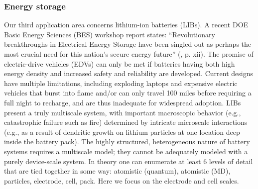 \documentclass[11pt]{article}
\newcommand{\MarginPar}[1]{\marginpar{%
\vskip-\baselineskip %
\raggedright\tiny\sffamily
\hrule\smallskip{\color{red}#1}\par\smallskip\hrule}}
\begin{document}
\subsubsection*{Energy storage}
Our third application area concerns lithium-ion batteries (LIBs).
A recent DOE Basic Energy Sciences (BES) workshop report states: 
``Revolutionary breakthroughs in Electrical Energy Storage have been singled out as perhaps the most crucial need
for this nation's secure energy future''  (\cite{ees_rpt}, p. xii).
The promise of electric-drive vehicles (EDVs) can only be met if batteries having both high energy density and increased safety 
and reliability are developed.  Current designs have multiple limitations,
including exploding laptops and expensive electric vehicles that burst into 
flame and/or can only travel 100 miles before requiring a full night to recharge, and are thus inadequate for widespread adoption.  
LIBs present a truly multiscale system, with important macroscopic behavior
(e.g., catastrophic failure such as fire) determined by intricate microscale
interactions (e.g., as a result of dendritic growth on lithium particles at
one location deep inside the battery pack). 
The highly structured, heterogeneous nature of battery systems
requires a multiscale model; they cannot be adequately modeled with a purely device-scale system. 
In theory one can enumerate at least 6 levels of detail that are tied together in some way: 
atomistic (quantum), atomistic (MD), particles, electrode, cell, pack. Here we
focus on the electrode and cell scales.
%
\end{document}
